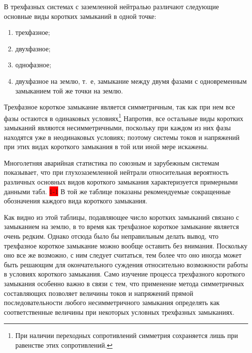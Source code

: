 В трехфазных системах с заземленной нейтралью различают следующие основные виды коротких замыканий в одной точке:

\begin{enumerate} 
	\item
	трехфазное;
	\item
	двухфазное;
	\item
	однофазное;
	\item
	двухфазное на землю, т.~е, замыкание между двумя фазами с одновременным замыканием той же точки на землю. 
\end{enumerate}

Трехфазное короткое замыкание является симметричным, так как при нем все фазы остаются в одинаковых условиях\footnote{При наличии переходных сопротивлений симметрия сохраняется лишь при равенстве этих сопротивлений.} Напротив, все остальные виды коротких замыканий являются несимметричными, поскольку при каждом из них фазы находятся уже в неодинаковых условиях; поэтому системы токов и напряжений при этих видах короткого замыкания в той или иной мере искажены.
	
Многолетняя аварийная статистика по союзным и зарубежным системам показывает, что при глухозаземленной нейтрали относительная вероятность различных основных видов короткого замыкания характеризуется примерными данными табл. \colorbox{red}{1-1} В той же таблице показаны рекомендуемые сокращенные обозначения каждого вида короткого замыкания.

Как видно из этой таблицы, подавляющее число коротких замыканий связано с замыканием на землю, в то время как трехфазное короткое замыкание является очень редким. Однако отсюда было бы неправильным делать вывод, что трехфазное короткое замыкание можно вообще оставить без внимания. Поскольку оно все же возможно, с ним следует считаться, тем более что оно иногда может быть решающим для окончательного суждения относительно возможности работы в условиях короткого замыкания. Само изучение процесса трехфазного короткого замыкания особенно важно в связи с тем, что применение метода симметричных составляющих позволяет величины токов и напряжений прямой последовательности любого несимметричного замыкания определять как соответственные величины при некоторых условных трехфазных замыканиях.